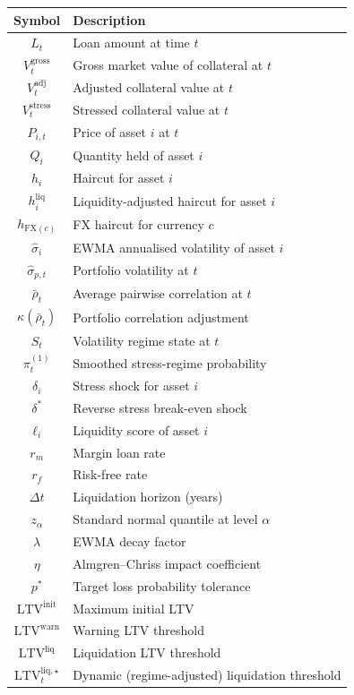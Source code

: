 \documentclass[12pt, a4paper]{article}
\newcommand{\LTV}{\mathrm{LTV}}
\newcommand{\1}{\mathbbm{1}}
\begin{document}
\begin{longtable}{cl}
\toprule
\textbf{Symbol} & \textbf{Description} \\
\midrule
\endhead
$L_t$                        & Loan amount at time $t$ \\
$V_t^{\mathrm{gross}}$       & Gross market value of collateral at $t$ \\
$V_t^{\mathrm{adj}}$         & Adjusted collateral value at $t$ \\
$V_t^{\mathrm{stress}}$      & Stressed collateral value at $t$ \\
$P_{i,t}$                    & Price of asset $i$ at $t$ \\
$Q_i$                        & Quantity held of asset $i$ \\
$h_i$                        & Haircut for asset $i$ \\
$h_i^{\mathrm{liq}}$         & Liquidity-adjusted haircut for asset $i$ \\
$h_{\mathrm{FX}(c)}$         & FX haircut for currency $c$ \\
$\hat{\sigma}_i$             & EWMA annualised volatility of asset $i$ \\
$\hat{\sigma}_{p,t}$         & Portfolio volatility at $t$ \\
$\bar{\rho}_t$               & Average pairwise correlation at $t$ \\
$\kappa(\bar{\rho}_t)$       & Portfolio correlation adjustment \\
$S_t$                        & Volatility regime state at $t$ \\
$\pi_t^{(1)}$                & Smoothed stress-regime probability \\
$\delta_i$                   & Stress shock for asset $i$ \\
$\delta^*$                   & Reverse stress break-even shock \\
$\ell_i$                     & Liquidity score of asset $i$ \\
$r_m$                        & Margin loan rate \\
$r_f$                        & Risk-free rate \\
$\Delta t$                   & Liquidation horizon (years) \\
$z_\alpha$                   & Standard normal quantile at level $\alpha$ \\
$\lambda$                    & EWMA decay factor \\
$\eta$                       & Almgren--Chriss impact coefficient \\
$p^*$                        & Target loss probability tolerance \\
$\LTV^{\mathrm{init}}$       & Maximum initial LTV \\
$\LTV^{\mathrm{warn}}$       & Warning LTV threshold \\
$\LTV^{\mathrm{liq}}$        & Liquidation LTV threshold \\
$\LTV^{\mathrm{liq},\star}_t$& Dynamic (regime-adjusted) liquidation threshold \\
\bottomrule
\end{longtable}
\end{document}
